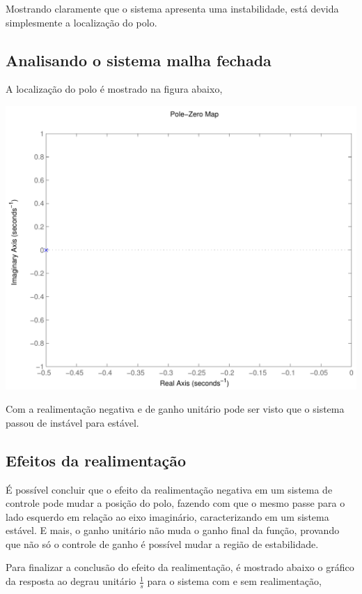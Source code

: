 \documentclass[paper=a4, fontsize=11pt]{article}
\begin{document}
Mostrando claramente que o sistema apresenta uma instabilidade, está devida 
simplesmente a localização do polo.

\subsection{Analisando o sistema malha fechada}

A localização do polo é mostrado na figura abaixo,

\begin{center}
    \includegraphics[scale=.5]{q2pzfechada.pdf}
\end{center}

Com a realimentação negativa e de ganho unitário pode ser visto que o sistema passou
de instável para estável.

\subsection{Efeitos da realimentação}

É possível concluir que o efeito da realimentação negativa em um sistema de controle
pode mudar a posição do polo, fazendo com que o mesmo passe para o lado esquerdo em
relação ao eixo imaginário, caracterizando em um sistema estável. E mais, o ganho
unitário não muda o ganho final da função, provando que não só o controle de ganho
é possível mudar a região de estabilidade.

Para finalizar a conclusão do efeito da realimentação, é mostrado abaixo o gráfico da resposta
ao degrau unitário $\frac{1}{s}$ para o sistema com e sem realimentação,
\end{document}
